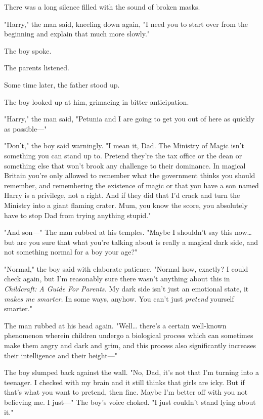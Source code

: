 There was a long silence filled with the sound of broken masks.

"Harry," the man said, kneeling down again, "I need you to start over from the
beginning and explain that much more slowly."

The boy spoke.

The parents listened.

Some time later, the father stood up.

The boy looked up at him, grimacing in bitter anticipation.

"Harry," the man said, "Petunia and I are going to get you out of here as
quickly as possible---"

"Don't," the boy said warningly. "I mean it, Dad. The Ministry of Magic isn't
something you can stand up to. Pretend they're the tax office or the dean or
something else that won't brook any challenge to their dominance. In magical
Britain you're only allowed to remember what the government thinks you should
remember, and remembering the existence of magic or that you have a son named
Harry is a privilege, not a right. And if they did that I'd crack and turn the
Ministry into a giant flaming crater. Mum, you know the score, you absolutely
have to stop Dad from trying anything stupid."

"And son---" The man rubbed at his temples. "Maybe I shouldn't say this
now{\ldots} but are you sure that what you're talking about is really a magical
dark side, and not something normal for a boy your age?"

"Normal," the boy said with elaborate patience. "Normal how, exactly? I could
check again, but I'm reasonably sure there wasn't anything about this in
\emph{Childcraft: A Guide For Parents.} My dark side isn't just an emotional
state, it \emph{makes me smarter.} In some ways, anyhow. You can't just
\emph{pretend} yourself smarter."

The man rubbed at his head again. "Well{\ldots} there's a certain well-known
phenomenon wherein children undergo a biological process which can sometimes
make them angry and dark and grim, and this process also significantly
increases their intelligence and their height---"

The boy slumped back against the wall. "No, Dad, it's not that I'm turning into
a teenager. I checked with my brain and it still thinks that girls are icky.
But if that's what you want to pretend, then fine. Maybe I'm better off with
you not believing me. I just---" The boy's voice choked. "I just couldn't stand
lying about it."

